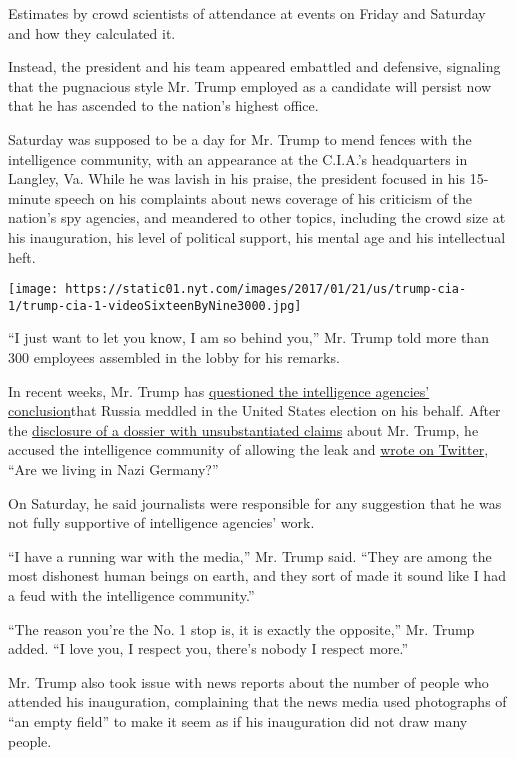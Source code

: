 Estimates by crowd scientists of attendance at events on Friday and
Saturday and how they calculated it.

Instead, the president and his team appeared embattled and defensive,
signaling that the pugnacious style Mr. Trump employed as a candidate
will persist now that he has ascended to the nation's highest office.

Saturday was supposed to be a day for Mr. Trump to mend fences with the
intelligence community, with an appearance at the C.I.A.'s headquarters
in Langley, Va. While he was lavish in his praise, the president focused
in his 15-minute speech on his complaints about news coverage of his
criticism of the nation's spy agencies, and meandered to other topics,
including the crowd size at his inauguration, his level of political
support, his mental age and his intellectual heft.

\texttt{[image: https://static01.nyt.com/images/2017/01/21/us/trump-cia-1/trump-cia-1-videoSixteenByNine3000.jpg]}

``I just want to let you know, I am so behind you,'' Mr. Trump told more
than 300 employees assembled in the lobby for his remarks.

In recent weeks, Mr. Trump has
\href{https://www.nytimes.com/2016/12/11/us/politics/trump-russia-democrats.html}{questioned
the intelligence agencies' conclusion}that Russia meddled in the United
States election on his behalf. After the
\href{https://www.nytimes.com/2017/01/11/us/politics/donald-trump-russia-intelligence.html}{disclosure
of a dossier with unsubstantiated claims} about Mr. Trump, he accused
the intelligence community of allowing the leak and
\href{https://twitter.com/realDonaldTrump/status/819164172781060096}{wrote
on Twitter}, ``Are we living in Nazi Germany?''

On Saturday, he said journalists were responsible for any suggestion
that he was not fully supportive of intelligence agencies' work.

``I have a running war with the media,'' Mr. Trump said. ``They are
among the most dishonest human beings on earth, and they sort of made it
sound like I had a feud with the intelligence community.''

``The reason you're the No. 1 stop is, it is exactly the opposite,'' Mr.
Trump added. ``I love you, I respect you, there's nobody I respect
more.''

Mr. Trump also took issue with news reports about the number of people
who attended his inauguration, complaining that the news media used
photographs of ``an empty field'' to make it seem as if his inauguration
did not draw many people.

